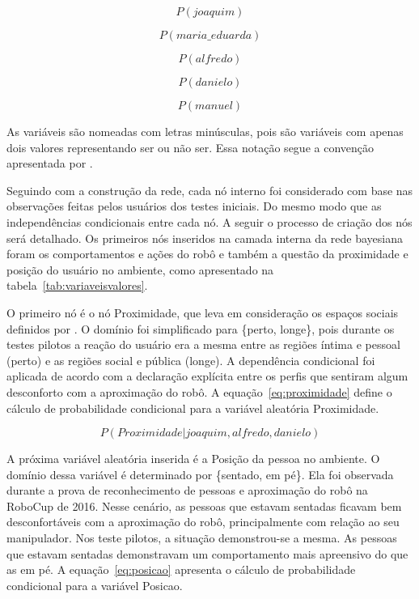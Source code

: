 \begin{equation}
	\label{eq:joaquim}
	P(joaquim)
\end{equation}

\begin{equation}
	\label{eq:mariaeduarda}
	P(maria\_eduarda)
\end{equation}

\begin{equation}
	\label{eq:alfredo}
	P(alfredo)
\end{equation}

\begin{equation}
	\label{eq:danielo}
	P(danielo)
\end{equation}

\begin{equation}
	\label{eq:manuel}
	P(manuel)
\end{equation}

As variáveis são nomeadas com letras minúsculas, pois são variáveis com apenas dois valores representando ser ou não ser. Essa notação segue a convenção apresentada por .

Seguindo com a construção da rede, cada nó interno foi considerado com base nas observações feitas pelos usuários dos testes iniciais. Do mesmo modo que as independências condicionais entre cada nó. A seguir o processo de criação dos nós será detalhado. Os primeiros nós inseridos na camada interna da rede bayesiana foram os comportamentos e ações do robô e também a questão da proximidade e posição do usuário no ambiente, como apresentado na tabela~\ref{tab:variaveisvalores}.

O primeiro nó é o nó Proximidade, que leva em consideração os espaços sociais definidos por . O domínio foi simplificado para \{perto, longe\}, pois durante os testes pilotos a reação do usuário era a mesma entre as regiões íntima e pessoal (perto) e as regiões social e pública (longe). A dependência condicional foi aplicada de acordo com a declaração explícita entre os perfis que sentiram algum desconforto com a aproximação do robô. A equação~\ref{eq:proximidade} define o cálculo de probabilidade condicional para a variável aleatória Proximidade.

\begin{equation}
	\label{eq:proximidade}
	P(Proximidade | joaquim, alfredo, danielo)
\end{equation}

A próxima variável aleatória inserida é a Posição da pessoa no ambiente. O domínio dessa variável é determinado por \{sentado, em pé\}. Ela foi observada durante a prova de reconhecimento de pessoas e aproximação do robô na RoboCup de 2016. Nesse cenário, as pessoas que estavam sentadas ficavam bem desconfortáveis com a aproximação do robô, principalmente com relação ao seu manipulador. Nos teste pilotos, a situação demonstrou-se a mesma. As pessoas que estavam sentadas demonstravam um comportamento mais apreensivo do que as em pé. A equação~\ref{eq:posicao} apresenta o cálculo de probabilidade condicional para a variável Posicao.

